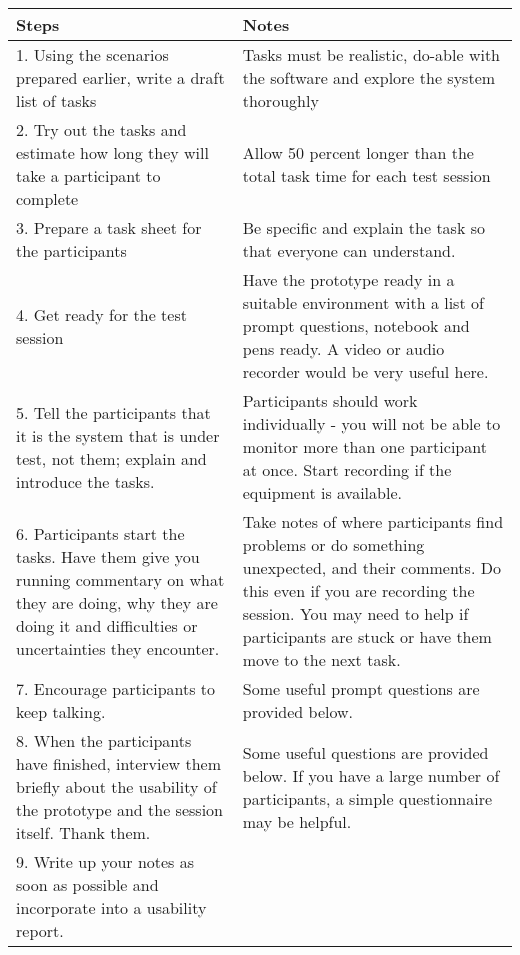\begin{longtable}{ | p{4.7cm} | p{5.1cm} |}
  \hline
  Steps & Notes \\ \hline
  1. Using the scenarios prepared earlier, write a draft list of tasks & Tasks must be realistic, do-able with the software and explore the system thoroughly \\ \hline
	2. Try out the tasks and estimate how long they will take a participant to complete & Allow 50 percent longer than the total task time for each test session \\ \hline
	3. Prepare a task sheet for the participants & Be specific and explain the task so that everyone can understand. \\ \hline
	4. Get ready for the test session & Have the prototype ready in a suitable environment with a list of prompt questions, notebook and pens ready. A video or audio recorder would be very useful here. \\ \hline
	5. Tell the participants that it is the system that is under test, not them; explain and introduce the tasks. & Participants should work individually - you will not be able to monitor more than one participant at once. Start recording if the equipment is available. \\ \hline
	6. Participants start the tasks. Have them give you running commentary on what they are doing, why they are doing it and difficulties or uncertainties they encounter. & Take notes of where participants find problems or do something unexpected, and their comments. Do this even if you are recording the session. You may need to help if participants are stuck or have them move to the next task. \\ \hline
	7. Encourage participants to keep talking. & Some useful prompt questions are provided below. \\ \hline
	8. When the participants have finished, interview them briefly about the usability of the prototype and the session itself. Thank them. & Some useful questions are provided below. If you have a large number of participants, a simple questionnaire may be helpful. \\ \hline
	9. Write up your notes as soon as possible and incorporate into a usability report. & \\ \hline
\end{longtable}\cite{Benyon10}